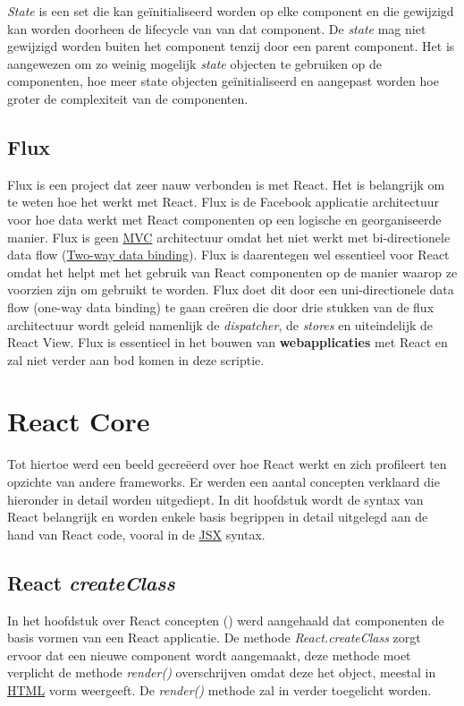 		\emph{State} is een set die kan geïnitialiseerd worden op elke component en die gewijzigd kan worden doorheen de lifecycle van van dat component. De \emph{state} mag niet gewijzigd worden buiten het component tenzij door een parent component. Het is aangewezen om zo weinig mogelijk \emph{state} objecten te gebruiken op de componenten, hoe meer state objecten geïnitialiseerd en aangepast worden hoe groter de complexiteit van de componenten.
	
	\subsection{Flux}
		
		Flux is een project dat zeer nauw verbonden is met React. Het is belangrijk om te weten hoe het werkt met React. Flux is de Facebook applicatie architectuur voor hoe data werkt met React componenten op een logische en georganiseerde manier. Flux is geen \hyperref[mvc]{MVC} architectuur omdat het niet werkt met bi-directionele data flow (\hyperref[twdb]{Two-way data binding}). Flux is daarentegen wel essentieel voor React omdat het helpt met het gebruik van React componenten op de manier waarop ze voorzien zijn om gebruikt te worden. Flux doet dit door een uni-directionele data flow (one-way data binding) te gaan creëren die door drie stukken van de flux architectuur wordt geleid namenlijk de \emph{dispatcher}, de \emph{stores} en uiteindelijk de React View. Flux is essentieel in het bouwen van \textbf{webapplicaties} met React en zal niet verder aan bod komen in deze scriptie.

\section{React Core}
	
	Tot hiertoe werd een beeld gecreëerd over hoe React werkt en zich profileert ten opzichte van andere frameworks. Er werden een aantal concepten verklaard die hieronder in detail worden uitgediept. In dit hoofdstuk wordt de syntax van React belangrijk en worden enkele basis begrippen in detail uitgelegd aan de hand van React code, vooral in de \hyperref[jsx]{JSX} syntax.
	
	\subsection{React \emph{createClass}}
		
		In het hoofdstuk over React concepten () werd aangehaald dat componenten de basis vormen van een React applicatie. De methode \emph{React.createClass} zorgt ervoor dat een nieuwe component wordt aangemaakt, deze methode moet verplicht de methode \emph{render()} overschrijven omdat deze het object, meestal in \hyperref[html]{HTML} vorm weergeeft. De \emph{render()} methode zal in  verder toegelicht worden.
		

